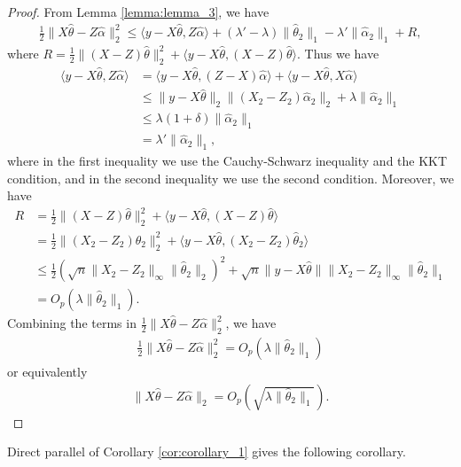 \documentclass[a4paper]{article}
\newcommand{\ra}{\rangle}
\newcommand{\la}{\langle}
\begin{document}
\begin{proof}
From Lemma \ref{lemma:lemma_3}, we have
\begin{align*}
\frac{1}{2}\|X\hat{\theta} - Z\hat{\alpha}\|_2^2 \leq \la y-X\hat{\theta}, Z\hat{\alpha}\ra + (\lambda' - \lambda)\|\hat{\theta}_2\|_1 -\lambda'\|\hat{\alpha}_2\|_1 + R,
\end{align*}
where $R = \frac{1}{2}\|(X-Z)\hat{\theta}\|_2^2 + \la y-X\hat{\theta}, (X-Z)\hat{\theta}\ra$. Thus we have
\begin{align*}
\la y-X\hat{\theta}, Z\hat{\alpha}\ra &= \la y-X\hat{\theta}, (Z-X)\hat{\alpha}\ra + \la y-X\hat{\theta}, X\hat{\alpha}\ra\\
&\leq \|y-X\hat{\theta}\|_2\|(X_2-Z_2)\hat{\alpha}_2\|_2 + \lambda\|\hat{\alpha}_2\|_1\\
&\leq \lambda(1+\delta)\|\hat{\alpha}_2\|_1\\
&= \lambda'\|\hat{\alpha}_2\|_1,
\end{align*}
where in the first inequality we use the Cauchy-Schwarz inequality and the KKT condition, and in the second inequality we use the second condition. Moreover, we have
\begin{align*}
R &= \frac{1}{2}\|(X-Z)\hat{\theta}\|_2^2 + \la y-X\hat{\theta}, (X-Z)\hat{\theta}\ra\\
&= \frac{1}{2}\|(X_2-Z_2)\hat{\theta}_2\|_2^2 + \la y-X\hat{\theta}, (X_2-Z_2)\hat{\theta}_2\ra\\
&\leq \frac{1}{2}(\sqrt{n}\|X_2-Z_2\|_\infty\|\hat{\theta}_2\|_2)^2 + \sqrt{n}\|y-X\hat{\theta}\|\|X_2-Z_2\|_\infty\|\hat{\theta}_2\|_1\\
&= O_p(\lambda\|\hat{\theta}_2\|_1).
\end{align*}
Combining the terms in $\frac{1}{2}\|X\hat{\theta} - Z\hat{\alpha}\|_2^2$, we have
\begin{align*}
\frac{1}{2}\|X\hat{\theta} - Z\hat{\alpha}\|_2^2 = O_p(\lambda\|\hat{\theta}_2\|_1)
\end{align*}
or equivalently
\begin{align*}
\|X\hat{\theta} - Z\hat{\alpha}\|_2 = O_p(\sqrt{\lambda\|\hat{\theta}_2\|_1}).
\end{align*}
\end{proof}

Direct parallel of Corollary \eqref{cor:corollary_1} gives the following corollary.
\end{document}
